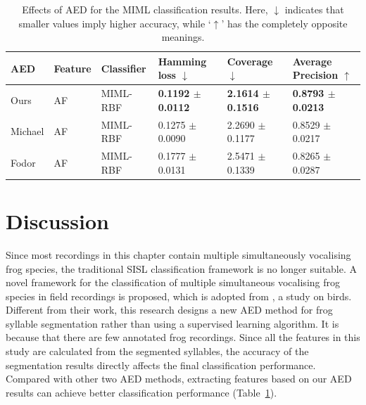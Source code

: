 \begin{table}[htb!]
\centering
\caption[Effects of AED for the MIML classification results]{Effects of AED for the MIML classification results. Here, $\downarrow$ indicates that smaller values imply higher accuracy, while ‘$\uparrow$’ has the completely opposite meanings.}
\label{Ch6:AEDCompare}
\begin{tabular}{llllll}
\hline\hline
AED     & Feature & Classifier & Hamming loss $\downarrow$ & Coverage $\downarrow$     & Average Precision  $\uparrow$\\ \hline
Ours    & AF      & MIML-RBF   & \textbf{0.1192 $\pm$ 0.0112} & \textbf{2.1614 $\pm$ 0.1516} & \textbf{0.8793 $\pm$ 0.0213}     \\ 
Michael & AF      & MIML-RBF   & 0.1275 $\pm$ 0.0090 & 2.2690 $\pm$ 0.1177 & 0.8529 $\pm$ 0.0217     \\ 
Fodor   & AF      & MIML-RBF   & 0.1777 $\pm$ 0.0131 & 2.5471 $\pm$ 0.1339 & 0.8265 $\pm$ 0.0287     \\ \hline\hline
\end{tabular}
\end{table}




\section{Discussion}
Since most recordings in this chapter contain multiple simultaneously vocalising frog species, the traditional SISL classification framework is no longer suitable. A novel framework for the classification of multiple simultaneous vocalising frog species in field recordings is proposed, which is adopted from \citep{briggs2012acoustic}, a study on birds. Different from their work, this research designs a new AED method for frog syllable segmentation rather than using a supervised learning algorithm. It is because that there are few annotated frog recordings. Since all the features in this study are calculated from the segmented syllables, the accuracy of the segmentation results directly affects the final classification performance. Compared with other two AED methods, extracting features based on our AED results can achieve better classification performance (Table~\ref{Ch6:AEDCompare}).

